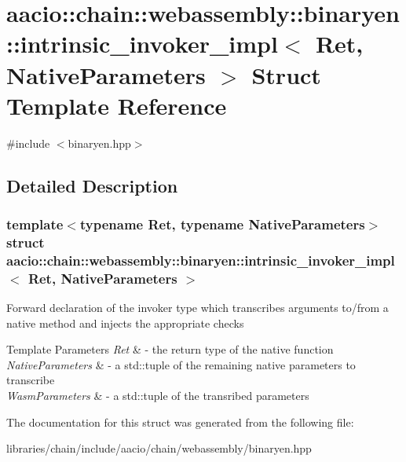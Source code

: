 \hypertarget{structaacio_1_1chain_1_1webassembly_1_1binaryen_1_1intrinsic__invoker__impl}{}\section{aacio\+:\+:chain\+:\+:webassembly\+:\+:binaryen\+:\+:intrinsic\+\_\+invoker\+\_\+impl$<$ Ret, Native\+Parameters $>$ Struct Template Reference}
\label{structaacio_1_1chain_1_1webassembly_1_1binaryen_1_1intrinsic__invoker__impl}


{\ttfamily \#include $<$binaryen.\+hpp$>$}



\subsection{Detailed Description}
\subsubsection*{template$<$typename Ret, typename Native\+Parameters$>$\newline
struct aacio\+::chain\+::webassembly\+::binaryen\+::intrinsic\+\_\+invoker\+\_\+impl$<$ Ret, Native\+Parameters $>$}

Forward declaration of the invoker type which transcribes arguments to/from a native method and injects the appropriate checks


\begin{DoxyTemplParams}{Template Parameters}
{\em Ret} & -\/ the return type of the native function \\
\hline
{\em Native\+Parameters} & -\/ a std\+::tuple of the remaining native parameters to transcribe \\
\hline
{\em Wasm\+Parameters} & -\/ a std\+::tuple of the transribed parameters \\
\hline
\end{DoxyTemplParams}


The documentation for this struct was generated from the following file\+:\begin{DoxyCompactItemize}
\item 
libraries/chain/include/aacio/chain/webassembly/binaryen.\+hpp\end{DoxyCompactItemize}
